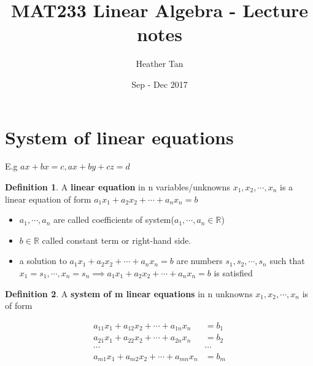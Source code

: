 \documentclass{article}
\title{MAT233 Linear Algebra - Lecture notes}
\author{Heather Tan}
\date{Sep - Dec 2017}
\theoremstyle{definition}
\newtheorem{definition}{Definition}[section]
\theoremstyle{thrm}
\begin{document}
\maketitle	
\tableofcontents
\pagebreak

\section{System of linear equations}
E.g $ax+bx=c, ax+by+cz=d$
\theoremstyle{definition}
\begin{definition}
	A \textbf{linear equation} in n variables/unknowns $x_1,x_2,\cdots,x_n$ is a linear equation of form $a_1x_1+a_2x_2+\cdots+a_n x_n=b$
\end{definition}
\begin{itemize}
	\item $a_1,\cdots,a_n$ are called coefficients of system($a_1,\cdots,a_n \in \mathbb{R}$)
	\item $b\in\mathbb{R}$ called constant term or right-hand side.
	\item a solution to $a_1x_1+a_2x_2+\cdots+a_n x_n=b$ are numbers $s_1, s_2,\cdots,s_n$ such that $x_1=s_1,\cdots, x_n=s_n \implies a_1x_1+a_2x_2+\cdots+a_n x_n=b$ is satisfied
\end{itemize}
\begin{definition}
	A \textbf{system of m linear equations} in n unknowns $x_1,x_2,\cdots,x_n$ is of form
\end{definition}
\begin{equation}
	\begin{matrix}
	\label{**}
	a_{11}x_1 + a_{12}x_2 + \cdots + a_{1n}x_n &= b_1\\
		a_{21}x_1 + a_{22}x_2 + \cdots + a_{2n}x_n &= b_2\\
		\cdots \quad \quad \quad \quad \quad \quad \quad &\cdots\\
		a_{m1}x_1 + a_{m2}x_2 + \cdots + a_{mn}x_n &= b_m\\
\end{matrix}
\end{equation}
\end{document}
